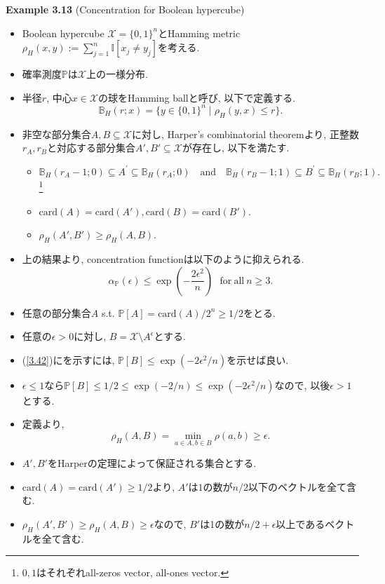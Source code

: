 \documentclass[aspectratio=169, dvipdfmx]{beamer}
\begin{document}
\begin{frame}{}{}
{\bf Example 3.13} (Concentration for Boolean hypercube)
\begin{itemize}
    \item Boolean hypercube $\mathcal{X} = \{0, 1\}^n$とHamming metric $\rho_H(x, y):= \sum_{j=1}^n\mathbb{I}[x_j\ne y_j]$を考える.
    \item 確率測度$\mathbb{P}$は$\mathcal{X}$上の一様分布.
    \item 半径$r$, 中心$x\in\mathcal{X}$の球をHamming ballと呼び, 以下で定義する.
    \[ \mathbb{B}_H(r; x) = \{y \in \{0,1\}^n \mid \rho_H(y,x)\le r\}. \]
    \item 非空な部分集合$A, B \subseteq \mathcal{X}$に対し, Harper's combinatorial theoremより,
    正整数$r_A, r_B$と対応する部分集合$A', B' \subseteq \mathcal{X}$が存在し, 以下を満たす.
    \begin{itemize}
        \item $\mathbb{B}_{H}\left(r_{A}-1 ; 0\right) \subseteq A^{\prime} \subseteq \mathbb{B}_{H}\left(r_{A} ; 0\right) \quad
            \mathrm{and} \quad \mathbb{B}_{H}\left(r_{B}-1 ; 1\right) \subseteq B^{\prime} \subseteq \mathbb{B}_{H}\left(r_{B} ; 1\right).$\footnote{$0,1$はそれぞれall-zeros vector, all-ones vector.}
        \item $\mathrm{card}(A) = \mathrm{card}(A'), \mathrm{card}(B)=\mathrm{card}(B')$.
        \item $\rho_H(A', B') \ge \rho_H(A, B)$.
    \end{itemize}
    \item 上の結果より, concentration functionは以下のように抑えられる.
    \[ \alpha_{\mathbb{P}}(\epsilon) \le \exp\left(-\frac{2\epsilon^2}{n}\right) \ \ \ \mathrm{for\ all}\ n\ge 3. \tag{3.42}\label{3.42} \]
\end{itemize}
\end{frame}

\begin{frame}
\begin{itemize}
    \item 任意の部分集合$A$ s.t. $\mathbb{P}[A] = \mathrm{card}(A)/2^n \ge 1/2$をとる.
    \item 任意の$\epsilon > 0$に対し, $B = \mathcal{X}\setminus A^\epsilon$とする.
    \item (\ref{3.42})にを示すには, $\mathbb{P}[B] \le \exp(-2\epsilon^2/n)$を示せば良い.
    \item $\epsilon \le 1$なら$\mathbb{P}[B]\le 1/2\le \exp(-2/n)\le \exp(-2\epsilon^2/n)$なので, 以後$\epsilon > 1$とする.
    \item 定義より,
    \[ \rho_H(A, B) = \min_{a \in A, b\in B}\rho(a,b) \ge \epsilon. \]
    \item $A', B'$をHarperの定理によって保証される集合とする. 
    \item $\mathrm{card}(A)=\mathrm{card}(A')\ge1/2$より, $A'$は$1$の数が$n/2$以下のベクトルを全て含む.
    \item $\rho_H(A', B')\ge \rho_H(A, B) \ge \epsilon$なので, $B'$は1の数が$n/2 + \epsilon$以上であるベクトルを全て含む.
\end{itemize}
\end{frame}
\end{document}
